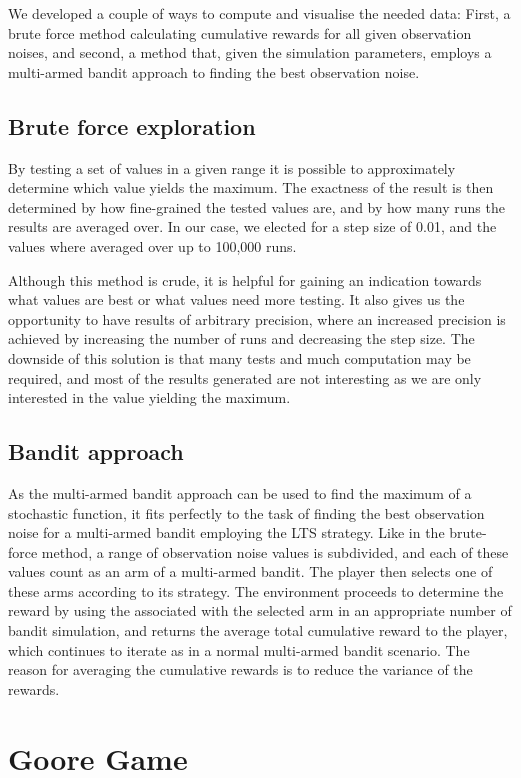 We developed a couple of ways to compute and visualise the needed data:
First, a brute force method calculating cumulative rewards for all given observation noises, and second, a method that, given the simulation parameters, employs a multi-armed bandit approach to finding the best observation noise.

\subsection{Brute force exploration}
By testing a set of values in a given range it is possible to approximately determine which value yields the maximum.
The exactness of the result is then determined by how fine-grained the tested values are, and by how many runs the results are averaged over.
In our case, we elected for a step size of 0.01, and the values where averaged over up to 100,000 runs.

Although this method is crude, it is helpful for gaining an indication towards what values are best or what values need more testing.
It also gives us the opportunity to have results of arbitrary precision, where an increased precision is achieved by increasing the number of runs and decreasing the step size.
The downside of this solution is that many tests and much computation may be required, and most of the results generated are not interesting as we are only interested in the value yielding the maximum.

\subsection{Bandit approach}
As the multi-armed bandit approach can be used to find the maximum of a stochastic function, it fits perfectly to the task of finding the best observation noise for a multi-armed bandit employing the LTS strategy.
Like in the brute-force method, a range of observation noise values is subdivided, and each of these values count as an arm of a multi-armed bandit.
The player then selects one of these arms according to its strategy.
The environment proceeds to determine the reward by using the \ob{} associated with the selected arm in an appropriate number of bandit simulation, and returns the average total cumulative reward to the player, which continues to iterate as in a normal multi-armed bandit scenario.
The reason for averaging the cumulative rewards is to reduce the variance of the rewards.

\section{Goore Game}

